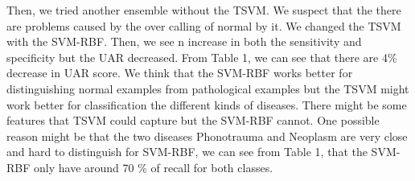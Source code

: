 Then, we tried another ensemble without the TSVM. We suspect that the there are problems caused by the over calling of normal by it. We changed the TSVM with the SVM-RBF. Then, we see n increase in both the sensitivity and specificity but the UAR decreased. From Table 1, we can see that there are 4\% decrease in UAR score. We think that the SVM-RBF works better for distinguishing normal examples from pathological examples but the TSVM might work better for classification the different kinds of diseases. There might be some features that TSVM could capture but the SVM-RBF cannot. One possible reason might be that the two diseases Phonotrauma and Neoplasm are very close and hard to distinguish for SVM-RBF, we can see from Table 1, that the SVM-RBF only have around 70 \% of recall for both classes.
 
